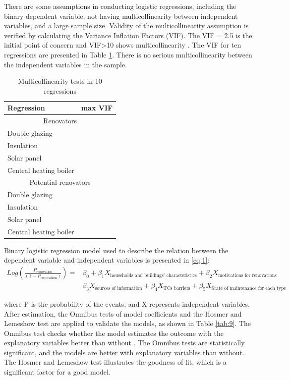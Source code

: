 \documentclass[preprint,12pt,3p]{elsarticle}
\begin{document}
\noindent
There are some assumptions in conducting logistic regressions, including the binary dependent variable, not having multicollinearity between independent variables, and a large sample size. Validity of the multicollinearity 
assumption is  verified by calculating the Variance Inflation Factors (VIF). The VIF = 2.5 is the initial point of concern and VIF\textgreater10 shows multicollinearity \citep {midi2010}. The VIF for ten regressions are presented in Table \ref{tab:4}. There is no serious multicollinearity between the independent variables in the sample.

\begin{table}[H]
\caption{Multicollinearity tests in 10 regressions}
\footnotesize
\centering
\begin{tabular}{@{}lc@{}}
\toprule
Regression & max VIF \\ \midrule
\multicolumn{2}{c}{Renovators} \\ \midrule
Double glazing &  \\
Insulation &  \\
Solar panel &  \\
Central heating boiler & \\\midrule
\multicolumn{2}{c}{Potential renovators} \\ \midrule
Double glazing &  \\
Insulation &  \\
Solar panel &  \\
Central heating boiler & \\ \bottomrule
\end{tabular}
\label{tab:4}
\end{table}

\noindent
Binary logistic regression model used to describe the relation between the dependent variable and independent variables is presented in \cref{eq:1}:
\begin{equation}
\begin{aligned}
Log \left(\frac{P_{\text{renovation}}}{(1-P_{\text{renovation}})} \right)=& \beta_0+\beta_1 X_{\text{households and buildings' characteristics}}+ \beta_2X_{\text{motivations for renovations}}\\
&\beta_3X_{\text{sources of information}}+\beta_4X_{\text{TCs barriers}}+\beta_5X_{\text{State of maintenance for each type}}
\end{aligned}
\label{eq:1}
\end{equation}

\noindent
where P is the probability of the events, and X represents independent variables. After estimation, the Omnibus tests of model coefficients and the Hosmer and Lemeshow test are applied to validate the models, as shown in Table \ref{tab:9}. The Omnibus test checks whether the model estimates the outcome with the explanatory variables better than without \citep {brant1990}. The Omnibus tests are statistically significant, and the models are better with explanatory variables than without. The Hosmer and Lemeshow test illustrates the goodness of fit, which is a significant factor for a good model.
\end{document}
